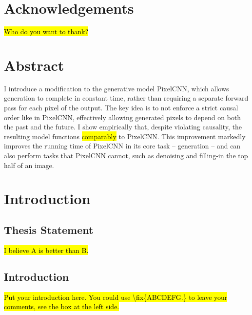 \documentclass[11pt, a4paper]{book}
\begin{document}
\cleardoublepage
\pagestyle{empty}
\chapter*{Acknowledgements}
\hl{Who do you want to thank?}


\cleardoublepage
\pagestyle{headings}
\chapter*{Abstract}
\vspace{-1em}
I introduce a modification to the generative model PixelCNN, which allows generation to complete in constant time, rather than requiring a separate forward pass for each pixel of the output. The key idea is to not enforce a strict causal order like in PixelCNN, effectively allowing generated pixels to depend on both the past and the future. I show empirically that, despite violating causality, the resulting model functions \hl{comparably} to PixelCNN. This improvement markedly improves the running time of PixelCNN in its core task -- generation -- and can also perform tasks that PixelCNN cannot, such as denoising and filling-in the top half of an image.

\cleardoublepage
\pagestyle{headings}
\tableofcontents
\listoffigures
\listoftables

\mainmatter

\chapter{Introduction}
\label{cha:intro}


\section{Thesis Statement}
\label{sec:thesisstatement}
\hl{I believe A is better than B.}

\section{Introduction}
\label{sec:problemstatement}
\hl{Put your introduction here. You could use \textbackslash fix\{ABCDEFG.\} to
leave your comments, see the box at the left side.}
\end{document}
